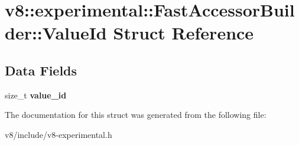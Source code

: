 \hypertarget{structv8_1_1experimental_1_1FastAccessorBuilder_1_1ValueId}{}\section{v8\+:\+:experimental\+:\+:Fast\+Accessor\+Builder\+:\+:Value\+Id Struct Reference}
\label{structv8_1_1experimental_1_1FastAccessorBuilder_1_1ValueId}
\subsection*{Data Fields}
\begin{DoxyCompactItemize}
\item 
size\+\_\+t {\bfseries value\+\_\+id}\hypertarget{structv8_1_1experimental_1_1FastAccessorBuilder_1_1ValueId_ab344ca323c52a8efce5855a853bffe86}{}\label{structv8_1_1experimental_1_1FastAccessorBuilder_1_1ValueId_ab344ca323c52a8efce5855a853bffe86}

\end{DoxyCompactItemize}


The documentation for this struct was generated from the following file\+:\begin{DoxyCompactItemize}
\item 
v8/include/v8-\/experimental.\+h\end{DoxyCompactItemize}
